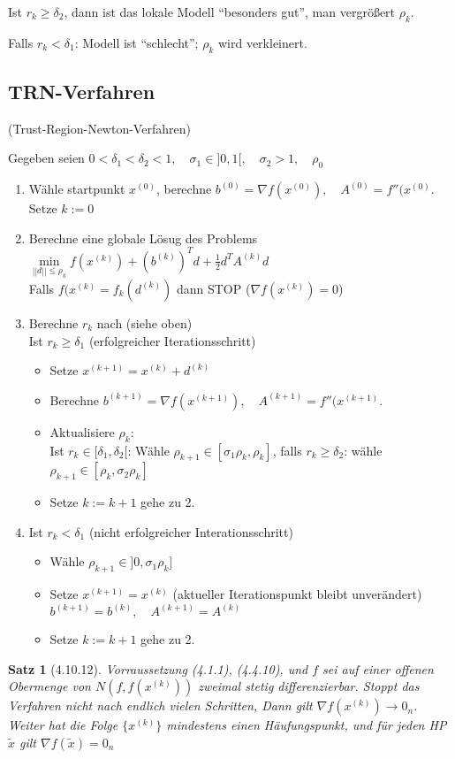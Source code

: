 \documentclass[ngerman,halfparskip]{scrartcl}
\newtheorem*{satz}{Satz}
\theoremstyle{definition}
\begin{document}
Ist $r_k \geq \delta_2$, dann ist das lokale Modell "`besonders gut"', man vergrößert $\rho_k$.

Falls $r_k<\delta_1$: Modell ist "`schlecht"'; $\rho_k$ wird verkleinert.

\subsection*{TRN-Verfahren} (Trust-Region-Newton-Verfahren)

Gegeben seien $0<\delta_1 < \delta_2 <1, \quad \sigma_1\in]0,1[, \quad \sigma_2>1, \quad \rho_0$
\begin{enumerate}
\item Wähle startpunkt $x^{(0)}$, berechne $b^ {(0)}=\nabla f(x^{(0)}),\quad A^{(0)}=f''(x^{(0)}$. Setze $k:=0$
\item Berechne eine globale Lösug des Problems\\
$\min\limits_{||d||\leq \rho_k}f(x^{(k)})+(b^{(k)})^Td+\frac 12 d^TA^{(k)}d$\\
Falls $f(x^{(k)}=f_k(d^{(k)})$ dann STOP ($\nabla f(x^{(k)})=0$)
\item Berechne $r_k$ nach (siehe oben)\\
Ist $r_k\geq \delta _1$ (erfolgreicher Iterationsschritt)
\begin{itemize}
\item Setze $x^{(k+1)}=x^{(k)}+d^{(k)}$
\item Berechne $b^ {(k+1)}=\nabla f(x^{(k+1)}),\quad A^{(k+1)}=f''(x^{(k+1)}$.
\item Aktualisiere $\rho_k$:\\
Ist $r_k\in[\delta_1,\delta_2[$: Wähle $\rho_{k+1}\in[\sigma_1\rho_k,\rho_k]$, falls $r_k\geq \delta_2$: wähle $\rho_{k+1}
\in [\rho_k,\sigma_2\rho_k]$
\item Setze $k:=k+1$ gehe zu 2.
\end{itemize}
\item Ist $r_k<\delta_1$ (nicht erfolgreicher Interationsschritt)
\begin{itemize}
\item Wähle $\rho_{k+1}\in ]0,\sigma_1\rho_k]$
\item Setze $x^{(k+1)}=x^{(k)}$ (aktueller Iterationspunkt bleibt unverändert) $b^{(k+1)}=b^{(k)}, \quad A^{(k+1)}=A^{(k)}$
\item Setze $k:=k+1$ gehe zu 2.
\end{itemize}
\end{enumerate}

\begin{satz}[4.10.12]
Vorraussetzung (4.1.1), (4.4.10), und $f$ sei auf einer offenen Obermenge von $N(f,f(x^{(k)}))$ zweimal stetig differenzierbar. Stoppt das Verfahren nicht nach endlich vielen Schritten, Dann gilt $\nabla f(x^{(k)})\to 0_n$.\\
Weiter hat die Folge $\{x^{(k)}\}$ mindestens einen Häufungspunkt, und für jeden HP $\tilde x$ gilt $\nabla f(\tilde x)=0_n$
\end{satz}
\end{document}
